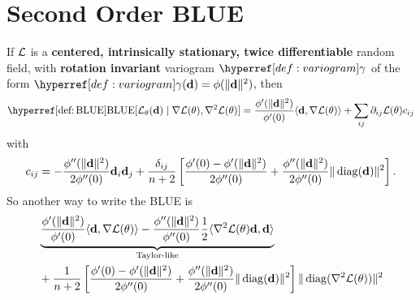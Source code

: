 \section{Second Order BLUE}

\begin{lemma}
	If \(\mathcal{L}\) is a \textbf{centered, intrinsically stationary, twice
	differentiable} random field, with \textbf{rotation invariant} variogram
	\(\variogram\) of the form \(\variogram(\step)=\phi(\|\step\|^2)\), then
	\begin{equation*}
		\BLUE[\Loss_\param(\step)\mid \grad\Loss(\param), \hessian\Loss(\param)]
		= \frac{\phi'(\|\step\|^2)}{\phi'(0)}\langle \step, \grad\Loss(\param)\rangle
		+ \sum_{ij}\partial_{ij}\Loss(\param)c_{ij}
	\end{equation*}
	with
	\begin{equation*}
		c_{ij} =
			- \frac{\phi''(\|\mathbf{d}\|^2)}{2\phi''(0)}\mathbf{d}_i\mathbf{d}_j
			+ \frac{\delta_{ij}}{n+2}\left[
				\frac{\phi'(0) - \phi'(\|\mathbf{d}\|^2)}{2\phi''(0)}
				+ \frac{\phi''(\|\mathbf{d}\|^2)}{2\phi''(0)}\|\operatorname{diag}(\mathbf{d})\|^2
			\right].
	\end{equation*}
	So another way to write the BLUE is
	\begin{equation*}
	\begin{aligned}
		&\underbrace{
			\frac{\phi'(\|\mathbf{d}\|^2)}{\phi'(0)}\langle \mathbf{d}, \nabla\mathcal{L}(\theta)\rangle
			- \frac{\phi''(\|\mathbf{d}\|^2)}{\phi''(0)} \frac12\langle \nabla^2\mathcal{L}(\theta)\mathbf{d}, \mathbf{d}\rangle
		}_{\text{Taylor-like}}\\
		&+ \frac{1}{n+2}\left[
				\frac{\phi'(0) - \phi'(\|\mathbf{d}\|^2)}{2\phi''(0)}
				+ \frac{\phi''(\|\mathbf{d}\|^2)}{2\phi''(0)}\|\operatorname{diag}(\mathbf{d})\|^2
		\right]
		\|\operatorname{diag}(\nabla^2 \mathcal{L}(\theta))\|^2
	\end{aligned}
	\end{equation*}
\end{lemma}


